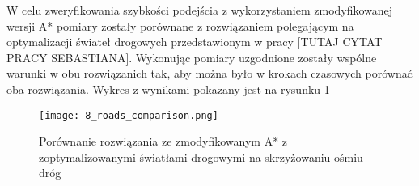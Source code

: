 W celu zweryfikowania szybkości podejścia z wykorzystaniem zmodyfikowanej wersji A* pomiary zostały porównane z rozwiązaniem polegającym na optymalizacji świateł drogowych przedstawionym w pracy [TUTAJ CYTAT PRACY SEBASTIANA].
\newline
\newline
Wykonując pomiary uzgodnione zostały wspólne warunki w obu rozwiązanich tak, aby można było w krokach czasowych porównać oba rozwiązania.
\newline
\newline
Wykres z wynikami pokazany jest na rysunku \ref{comparison}
\begin{figure}[ht]
  \texttt{[image: 8\_roads\_comparison.png]}
  \caption{Porównanie rozwiązania ze zmodyfikowanym A* z zoptymalizowanymi światłami drogowymi na skrzyżowaniu ośmiu dróg}
  \label{comparison}
\end{figure}
